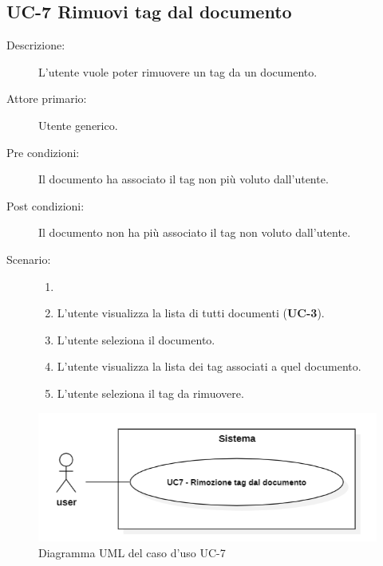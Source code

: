 \subsection{UC-7 Rimuovi tag dal documento}
\begin{description}
    \item[Descrizione:] L’utente vuole poter rimuovere un tag da un documento.
    \item[Attore primario:] Utente generico.
    \item[Pre condizioni:] Il documento ha associato il tag non più voluto dall’utente.
    \item[Post condizioni:] Il documento non ha più associato il tag non voluto dall’utente.
    \item[Scenario:]
    \begin{enumerate}
        \item[]
        \item L’utente visualizza la lista di tutti documenti (\textbf{UC-3}).
        \item L'utente seleziona il documento.
        \item L’utente visualizza la lista dei tag associati a quel documento.
        \item L’utente seleziona il tag da rimuovere.
    \end{enumerate}
\end{description}

\begin{figure}[H]
    \centering
    \includegraphics[width=0.8\linewidth]{UC7.png} %
    \caption{Diagramma UML del caso d'uso UC-7}
    \label{fig:UC6}
\end{figure}


